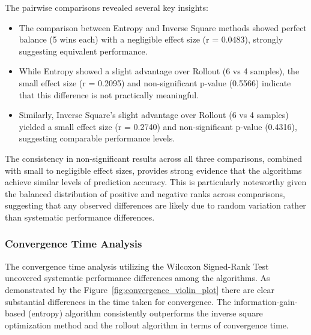 \documentclass[../report.tex]{subfiles}
\begin{document}
    The pairwise comparisons revealed several key insights:
       \begin{itemize}
           \item The comparison between Entropy and Inverse Square methods showed perfect balance (5 wins each) with a negligible effect size (r = 0.0483), strongly suggesting equivalent performance.
           \item While Entropy showed a slight advantage over Rollout (6 vs 4 samples), the small effect size (r = 0.2095) and non-significant p-value (0.5566) indicate that this difference is not practically meaningful.
           \item Similarly, Inverse Square's slight advantage over Rollout (6 vs 4 samples) yielded a small effect size (r = 0.2740) and non-significant p-value (0.4316), suggesting comparable performance levels.
       \end{itemize}
   
    \vspace{0.3cm}

    The consistency in non-significant results across all three comparisons, combined with small to negligible effect sizes, provides strong evidence that the algorithms achieve similar levels of prediction accuracy. This is particularly noteworthy given the balanced distribution of positive and negative ranks across comparisons, suggesting that any observed differences are likely due to random variation rather than systematic performance differences.
    
    \vspace{0.3cm}
    
    \subsubsection{Convergence Time Analysis}
   
    The convergence time analysis utilizing the Wilcoxon Signed-Rank Test uncovered systematic performance differences among the algorithms. As demonstrated by the 
    Figure~\ref{fig:convergence_violin_plot} there are clear substantial differences in the time taken for convergence. The information-gain-based (entropy)
    algorithm consistently outperforms the inverse square optimization method and the rollout algorithm in terms of convergence time. 
\end{document}
